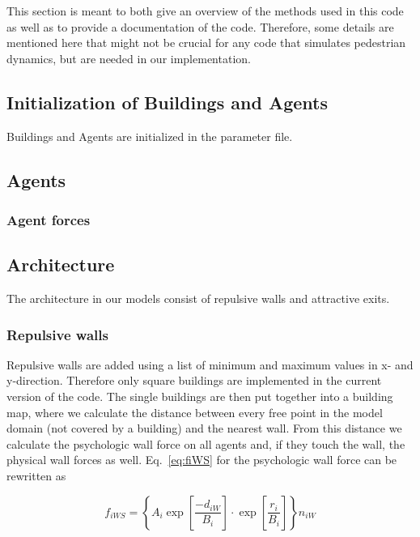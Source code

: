 \documentclass[11pt]{article}
\begin{document}
This section is meant to both give an overview of the methods used in this code as well as to provide a documentation of the code. Therefore, some details are mentioned here that might not be crucial for any code that simulates pedestrian dynamics, but are needed in our implementation. 

\subsection{Initialization of Buildings and Agents}

Buildings and Agents are initialized in the parameter file.

\subsection{Agents}

\subsubsection{Agent forces}

\subsection{Architecture}

The architecture in our models consist of repulsive walls and attractive exits.

\subsubsection{Repulsive walls}
\label{sec:WallsImplementation}

Repulsive walls are added using a list of minimum and maximum values in x- and y-direction. Therefore only square buildings are implemented in the current version of the code. The single buildings are then put together into a building map, where we calculate the distance between every free point in the model domain (not covered by a building) and the nearest wall. From this distance we calculate the psychologic wall force on all agents and, if they touch the wall, the physical wall forces as well. Eq.~\eqref{eq:fiWS} for the psychologic wall force can be rewritten as

\begin{equation}
	{f_{iWS}} = \left\{ {{A_i} {\exp \left[ {\frac{{ - {d_{iW}}}}{{{B_i}}}} \right] \cdot \exp \left[ {\frac{{{r_i}}}{{{B_i}}}} \right]} } \right\}{n_{iW}}
	\label{eq:fiWS2}
\end{equation}
\end{document}
